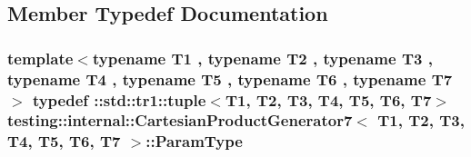 \subsection{Member Typedef Documentation}
\hypertarget{classtesting_1_1internal_1_1CartesianProductGenerator7_ac749b651dcf74699c59f548cd33e40c1}{
\subsubsection[{Param\-Type}]{\setlength{\rightskip}{0pt plus 5cm}template$<$typename T1 , typename T2 , typename T3 , typename T4 , typename T5 , typename T6 , typename T7 $>$ typedef \-::{\bf std\-::tr1\-::tuple}$<$T1, T2, T3, T4, T5, T6, T7$>$ {\bf testing\-::internal\-::\-Cartesian\-Product\-Generator7}$<$ T1, T2, T3, T4, T5, T6, T7 $>$\-::{\bf Param\-Type}}}\label{classtesting_1_1internal_1_1CartesianProductGenerator7_ac749b651dcf74699c59f548cd33e40c1}


